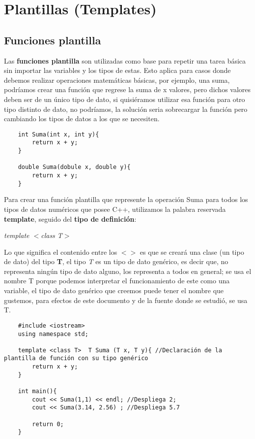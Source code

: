 \section{Plantillas (Templates)}


\subsection{Funciones plantilla}
\hspace{0.55cm}Las \textbf{funciones plantilla} son utilizadas como base para repetir una tarea básica sin importar las variables y los tipos de estas. Esto aplica para casos donde debemos realizar operaciones matemáticas básicas, por ejemplo, una suma, podríamos crear una función que regrese la suma de x valores, pero dichos valores deben ser de un único tipo de dato, si quisiéramos utilizar esa función para otro tipo distinto de dato, no podríamos, la solución seria sobrecargar la función pero cambiando los tipos de datos a los que se necesiten.
\begin{lstlisting}
    int Suma(int x, int y){
        return x + y;
    }
    
    double Suma(dobule x, double y){
        return x + y;
    }
\end{lstlisting}

Para crear una función plantilla que represente la operación Suma para todos los tipos de datos numéricos que posee C++, utilizamos la palabra reservada \textbf{template}, seguido del \textbf{tipo de definición}:
\begin{center}
    \textit{template $<$class T$>$}
\end{center}

Lo que significa el contenido entre los \textbf{$< >$} es que se creará una clase (un tipo de dato) del tipo \textbf{T}, el tipo \textit{T} es un tipo de dato genérico, es decir que, no representa ningún tipo de dato alguno, los representa a todos en general; se usa el nombre T porque podemos interpretar el funcionamiento de este como una variable, el tipo de dato genérico que creemos puede tener el nombre que gustemos, para efectos de este documento y de la fuente donde se estudió, se usa T.
\begin{lstlisting}
    #include <iostream>
    using namespace std;
    
    template <class T>  T Suma (T x, T y){ //Declaración de la plantilla de función con su tipo genérico
        return x + y;
    }
    
    int main(){
        cout << Suma(1,1) << endl; //Despliega 2;
        cout << Suma(3.14, 2.56) ; //Despliega 5.7
        
        return 0;
    }
\end{lstlisting}

